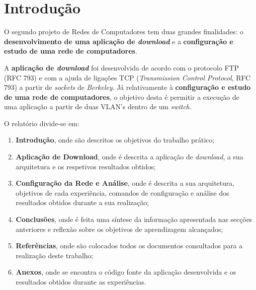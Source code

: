 \documentclass[article, a4paper, 11pt, oneside]{memoir}
\begin{document}
\newpage

\chapter[Introdução][Introdução]{Introdução} \label{\thechapter}

O segundo projeto de Redes de Computadores tem duas grandes finalidades: o \textbf{desenvolvimento 
de uma aplicação de \textit{download}} e a \textbf{configuração e estudo de uma rede de 
computadores}.

A \textbf{aplicação de \textit{download}} foi desenvolvida de acordo com o protocolo FTP (RFC 793) e 
com a ajuda de ligações TCP (\textit{Transmission Control Protocol}, RFC 793) a partir de 
\textit{sockets} de \textit{Berkeley}. Já relativamente à \textbf{configuração e estudo de uma 
rede de computadores}, o objetivo desta é permitir a execução de uma aplicação a partir de duas VLAN's 
dentro de um  \textit{switch}.

O relatório divide-se em:
\begin{enumerate}
  \item \textbf{Introdução}, onde são descritos os objetivos do trabalho prático;
  \item \textbf{Aplicação de Download}, onde é descrita a aplicação de \textit{download}, a sua 
arquitetura e os respetivos resultados obtidos;
  \item \textbf{Configuração da Rede e Análise}, onde é descrita a sua arquitetura, 
objetivos de cada experiência, comandos de configuração e análise dos resultados obtidos
durante a sua realização;
  \item \textbf{Conclusões}, onde é feita uma síntese da informação apresentada nas secções
anteriores e reflexão sobre os objetivos de aprendizagem alcançados;
  \item \textbf{Referências}, onde são colocados todos os documentos consultados para a realização 
deste trabalho;
  \item \textbf{Anexos}, onde se encontra o código fonte da aplicação desenvolvida e os resultados
obtidos durante as experiências.
\end{enumerate}

\end{document}
